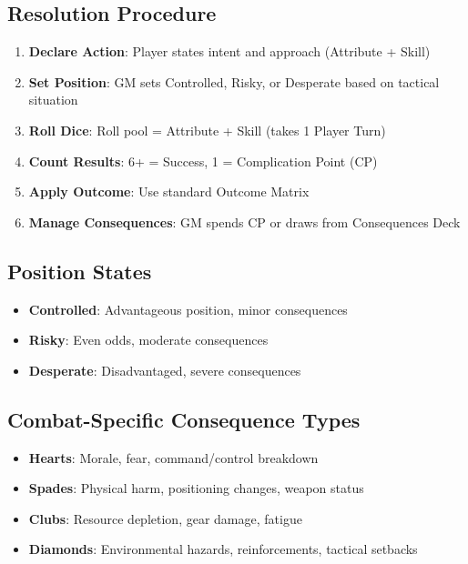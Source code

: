 \documentclass[11pt]{article}
\begin{document}
\subsection{Resolution Procedure}
\begin{enumerate}
    \item \textbf{Declare Action}: Player states intent and approach (Attribute + Skill)
    \item \textbf{Set Position}: GM sets Controlled, Risky, or Desperate based on tactical situation
    \item \textbf{Roll Dice}: Roll pool = Attribute + Skill (takes 1 Player Turn)
    \item \textbf{Count Results}: 6+ = Success, 1 = Complication Point (CP)
    \item \textbf{Apply Outcome}: Use standard Outcome Matrix
    \item \textbf{Manage Consequences}: GM spends CP or draws from Consequences Deck
\end{enumerate}


\subsection{Position States}
\begin{itemize}
    \item \textbf{Controlled}: Advantageous position, minor consequences
    \item \textbf{Risky}: Even odds, moderate consequences  
    \item \textbf{Desperate}: Disadvantaged, severe consequences
\end{itemize}

\subsection{Combat-Specific Consequence Types}
\begin{itemize}
    \item \textbf{Hearts}: Morale, fear, command/control breakdown
    \item \textbf{Spades}: Physical harm, positioning changes, weapon status
    \item \textbf{Clubs}: Resource depletion, gear damage, fatigue
    \item \textbf{Diamonds}: Environmental hazards, reinforcements, tactical setbacks
\end{itemize}
\end{document}

